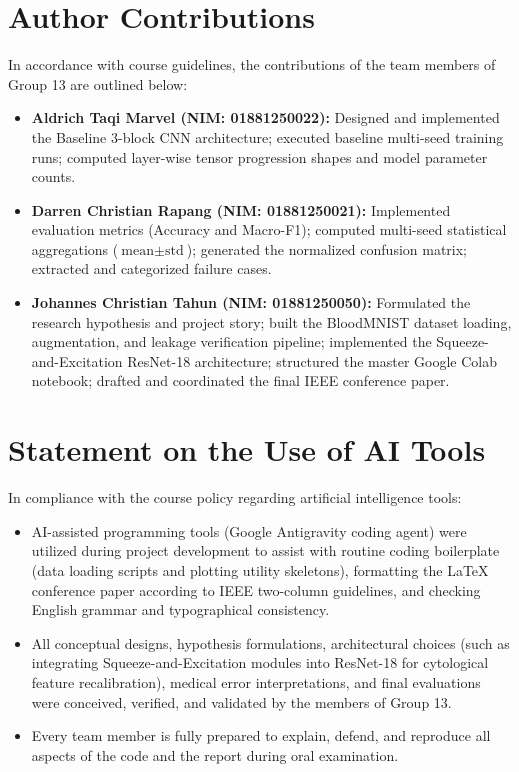\documentclass[conference]{IEEEtran}
\begin{document}
\section{Author Contributions}
In accordance with course guidelines, the contributions of the team members of Group 13 are outlined below:
\begin{itemize}
    \item \textbf{Aldrich Taqi Marvel (NIM: 01881250022):} Designed and implemented the Baseline 3-block CNN architecture; executed baseline multi-seed training runs; computed layer-wise tensor progression shapes and model parameter counts.
    \item \textbf{Darren Christian Rapang (NIM: 01881250021):} Implemented evaluation metrics (Accuracy and Macro-F1); computed multi-seed statistical aggregations ($\text{mean} \pm \text{std}$); generated the normalized confusion matrix; extracted and categorized failure cases.
    \item \textbf{Johannes Christian Tahun (NIM: 01881250050):} Formulated the research hypothesis and project story; built the BloodMNIST dataset loading, augmentation, and leakage verification pipeline; implemented the Squeeze-and-Excitation ResNet-18 architecture; structured the master Google Colab notebook; drafted and coordinated the final IEEE conference paper.
\end{itemize}

\section{Statement on the Use of AI Tools}
In compliance with the course policy regarding artificial intelligence tools:
\begin{itemize}
    \item AI-assisted programming tools (Google Antigravity coding agent) were utilized during project development to assist with routine coding boilerplate (data loading scripts and plotting utility skeletons), formatting the LaTeX conference paper according to IEEE two-column guidelines, and checking English grammar and typographical consistency.
    \item All conceptual designs, hypothesis formulations, architectural choices (such as integrating Squeeze-and-Excitation modules into ResNet-18 for cytological feature recalibration), medical error interpretations, and final evaluations were conceived, verified, and validated by the members of Group 13.
    \item Every team member is fully prepared to explain, defend, and reproduce all aspects of the code and the report during oral examination.
\end{itemize}
\end{document}
